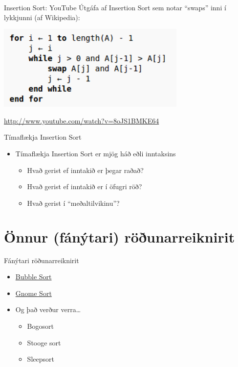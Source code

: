 \documentclass[handout]{beamer}
\begin{document}
\begin{frame}{Insertion Sort: YouTube}
Útgáfa af Insertion Sort sem notar ``swaps'' inni í lykkjunni (af Wikipedia):
\begin{center}
\includegraphics[width=0.7\textwidth]{Pics/InsertionSortSwaps}
\end{center}
\url{http://www.youtube.com/watch?v=8oJS1BMKE64}
\end{frame}

\begin{frame}{Tímaflækja Insertion Sort}
\begin{itemize}
 \item Tímaflækja Insertion Sort er mjög háð eðli inntaksins
 \begin{itemize}
  \item Hvað gerist ef inntakið er þegar raðað?
  \item Hvað gerist ef inntakið er í öfugri röð?
  \item Hvað gerist í ``meðaltilvikinu''?
 \end{itemize}
\end{itemize}

\end{frame}


\section{Önnur (fánýtari) röðunarreiknirit}
\begin{frame}{Fánýtari röðunarreiknirit}
\begin{itemize}
 \item \href{https://en.wikipedia.org/wiki/Bubble\_sort}{Bubble Sort}
 \item \href{https://en.wikipedia.org/wiki/Gnome\_sort}{Gnome Sort}
 \item Og það verður verra\ldots
 \begin{itemize}
  \item Bogosort
  \item Stooge sort
  \item Sleepsort
 \end{itemize}
\end{itemize}

\end{frame}
\end{document}
